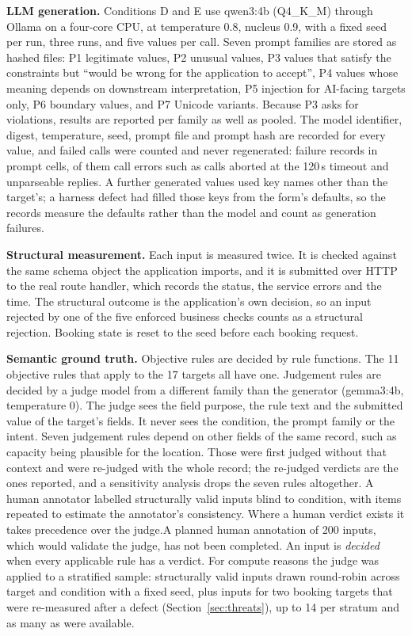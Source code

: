 \documentclass[journal]{IEEEtran}
\begin{document}
\textbf{LLM generation.} Conditions D and E use qwen3:4b (Q4\_K\_M) through Ollama on a four-core CPU, at temperature 0.8,
nucleus 0.9, with a fixed seed per run, three runs, and five values per call. Seven prompt families are
stored as hashed files: P1 legitimate values, P2 unusual values, P3 values that satisfy the constraints
but ``would be wrong for the application to accept'', P4 values whose meaning depends on downstream
interpretation, P5 injection for AI-facing targets only, P6 boundary values, and P7 Unicode variants.
Because P3 asks for violations, results are reported per family as well as pooled. The model
identifier, digest, temperature, seed, prompt file and prompt hash are recorded for every value, and
failed calls were counted and never regenerated:  failure records in
 prompt cells,  of them call errors such as calls aborted at the
120\,s timeout and  unparseable replies. A further  generated
values used key names other than the target's; a harness defect had filled those keys from the form's
defaults, so the records measure the defaults rather than the model and count as generation failures.

\textbf{Structural measurement.} Each input is measured twice. It is checked against the same schema object the application imports, and
it is submitted over HTTP to the real route handler, which records the status, the service errors and
the time. The structural outcome is the application's own decision, so an input rejected by one of the
five enforced business checks counts as a structural rejection. Booking state is reset to the seed
before each booking request.

\textbf{Semantic ground truth.} Objective rules are decided by rule functions. The 11 objective rules that apply to the 17 targets all
have one. Judgement rules are decided by a judge model from a different family than the generator
(gemma3:4b, temperature 0). The judge sees the field purpose, the rule text and the submitted value of
the target's fields. It never sees the condition, the prompt family or the intent. Seven judgement rules depend on other
fields of the same record, such as capacity being plausible for the location. Those were first judged
without that context and were re-judged with the whole record; the re-judged verdicts are the ones
reported, and a sensitivity analysis drops the seven rules altogether. \ifhumanlabels A human annotator labelled  structurally valid inputs blind to
condition, with  items repeated to estimate the annotator's consistency. Where a human
verdict exists it takes precedence over the judge.\else A planned human annotation of 200 inputs, which
would validate the judge, has not been completed.\fi{} An input is \emph{decided} when every applicable
rule has a verdict. For compute reasons the judge was applied to a stratified sample: 
structurally valid inputs drawn round-robin across target and condition with a fixed seed, plus
 inputs for two booking targets that were re-measured after a defect
(Section~\ref{sec:threats}), up to 14 per stratum and as many as were available.
\end{document}
